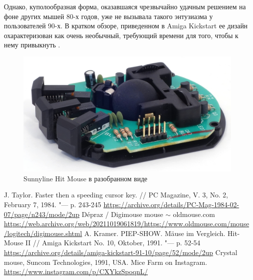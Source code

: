 \documentclass[11pt, a4paper]{article}
\begin{document}
Однако, куполообразная форма, оказавшаяся чрезвычайно удачным решением на фоне других мышей 80-х годов, уже не вызывала такого энтузиазма у пользователей 90-х. В кратком обзоре, приведенном в Amiga Kickstart ее дизайн охарактеризован как очень необычный, требующий времени для того, чтобы к нему привыкнуть \cite{sunnyline}.

 \begin{figure}[h]
    \centering
    \includegraphics[scale=0.7]{1982_depraz_digimouse/hitmouse_inside_30.jpg}
    \caption{Sunnyline Hit Mouse в разобранном виде}
    \label{fig:HitMouseInside}
\end{figure}

\begin{thebibliography}{9}
 J. Taylor. Faster then a speeding cursor key. // PC Magazine, V. 3, No. 2, February 7, 1984. "--- p. 243-245 \url{https://archive.org/details/PC-Mag-1984-02-07/page/n243/mode/2up}
 Dépraz / Digimouse mouse $\sim$ oldmouse.com \url{https://web.archive.org/web/20211019061819/https://www.oldmouse.com/mouse/logitech/digimouse.shtml}
 A. Kramer. PIEP-SHOW. M\"ause im Vergleich. Hit-Mouse II // Amiga Kickstart No. 10, Oktober, 1991. "--- p. 52-54 \url{https://archive.org/details/amiga-kickstart-91-10/page/52/mode/2up}
 Crystal mouse, Suncom Technologies, 1991, USA. Mice Farm on Instagram. \url{https://www.instagram.com/p/CXYkzSpoqnL/}
\end{thebibliography}
\end{document}
